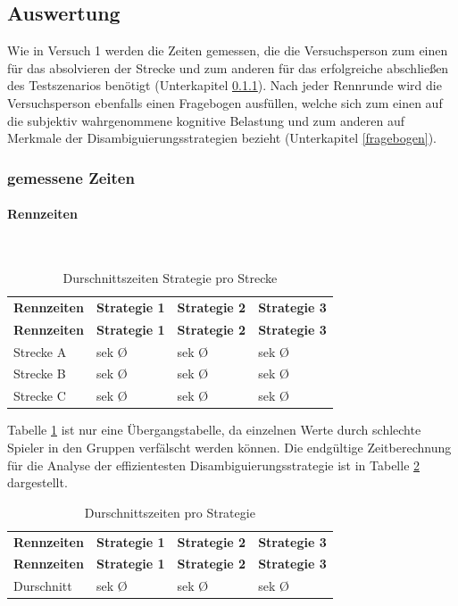 \documentclass[12pt,a4paper]{scrartcl}
\begin{document}
\subsection{Auswertung}

Wie in Versuch 1 werden die Zeiten gemessen, die die Versuchsperson zum einen für das absolvieren der Strecke und zum anderen für das erfolgreiche abschließen des Testszenarios benötigt (Unterkapitel \ref{messwerte}).
Nach jeder Rennrunde wird die Versuchsperson ebenfalls einen Fragebogen ausfüllen, welche sich zum einen auf die subjektiv wahrgenommene kognitive Belastung und zum anderen auf Merkmale der Disambiguierungsstrategien bezieht (Unterkapitel \ref{fragebogen}). 
\subsubsection{gemessene Zeiten}
\label{messwerte}
\paragraph{Rennzeiten} 
~\\
\begin{longtable}{p{3cm}p{3cm}p{3cm}p{3cm} }
	\label{durchschnittsvorl}\\
	\caption[Durschnittszeiten Strategie pro Strecke]{Durschnittszeiten Strategie pro Strecke}\\
	\hline
	\textbf{Rennzeiten}&\textbf{Strategie 1}&\textbf{Strategie 2} &\textbf{Strategie 3}\\
	\hline
	\endfirsthead
	\hline
	\textbf{Rennzeiten}&\textbf{Strategie 1}&\textbf{Strategie 2} &\textbf{Strategie 3}\\
	\hline
	\endhead
Strecke A & sek \O & sek \O & sek \O \\
Strecke B & sek \O & sek \O & sek \O\\
Strecke C  & sek \O & sek \O & sek \O\\

\hline
\end{longtable}

Tabelle \ref{durchschnittsvorl} ist nur eine Übergangstabelle, da  einzelnen Werte durch schlechte Spieler in den Gruppen verfälscht werden können. 
Die endgültige Zeitberechnung für die Analyse der effizientesten Disambiguierungsstrategie ist in Tabelle \ref{ZeitenDis} dargestellt.

\begin{longtable}{p{3cm}p{3cm}p{3cm}p{3cm} }
	\label{ZeitenDis}\\
	\caption[Durschnittszeiten pro Strategie]{Durschnittszeiten pro Strategie}\\
	\hline
	\textbf{Rennzeiten}&\textbf{Strategie 1}&\textbf{Strategie 2} &\textbf{Strategie 3}\\
	\hline
	\endfirsthead
	\hline
	\textbf{Rennzeiten}&\textbf{Strategie 1}&\textbf{Strategie 2} &\textbf{Strategie 3}\\
	\hline
	\endhead
Durschnitt & sek \O & sek \O & sek \O \\


\hline
\end{longtable}
\end{document}
